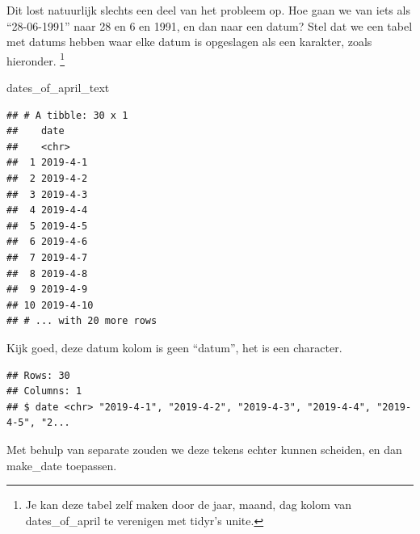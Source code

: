 \documentclass[]{tufte-book}
\newenvironment{Shaded}{}{}
\newcommand{\DataTypeTok}[1]{\textcolor[rgb]{0.56,0.13,0.00}{#1}}
\newcommand{\KeywordTok}[1]{\textcolor[rgb]{0.00,0.44,0.13}{\textbf{#1}}}
\newcommand{\NormalTok}[1]{#1}
\newcommand{\OperatorTok}[1]{\textcolor[rgb]{0.40,0.40,0.40}{#1}}
\newcommand{\StringTok}[1]{\textcolor[rgb]{0.25,0.44,0.63}{#1}}
\begin{document}
Dit lost natuurlijk slechts een deel van het probleem op. Hoe gaan we van iets als ``28-06-1991'' naar 28 en 6 en 1991, en dan naar een datum? Stel dat we een tabel met datums hebben waar elke datum is opgeslagen als een karakter, zoals hieronder. \footnote{Je kan deze tabel zelf maken door de jaar, maand, dag kolom van dates\_of\_april te verenigen met tidyr's unite.}

\begin{Shaded}
\begin{Highlighting}[]
\NormalTok{dates_of_april_text}
\end{Highlighting}
\end{Shaded}

\begin{verbatim}
## # A tibble: 30 x 1
##    date     
##    <chr>    
##  1 2019-4-1 
##  2 2019-4-2 
##  3 2019-4-3 
##  4 2019-4-4 
##  5 2019-4-5 
##  6 2019-4-6 
##  7 2019-4-7 
##  8 2019-4-8 
##  9 2019-4-9 
## 10 2019-4-10
## # ... with 20 more rows
\end{verbatim}

Kijk goed, deze datum kolom is geen ``datum'', het is een character.

\begin{Shaded}
\end{Shaded}

\begin{verbatim}
## Rows: 30
## Columns: 1
## $ date <chr> "2019-4-1", "2019-4-2", "2019-4-3", "2019-4-4", "2019-4-5", "2...
\end{verbatim}

Met behulp van separate zouden we deze tekens echter kunnen scheiden, en dan make\_date toepassen.

\begin{Shaded}
\end{Shaded}
\end{document}

